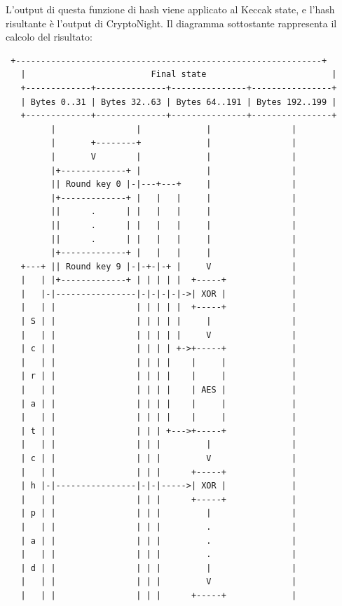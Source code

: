 L'output di questa funzione di hash viene applicato al Keccak state, e
l'hash risultante è l'output di CryptoNight. Il diagramma sottostante
rappresenta il calcolo del risultato:
\begin{verbatim}
 +-------------------------------------------------------------+
   |                         Final state                         |
   +-------------+--------------+---------------+----------------+
   | Bytes 0..31 | Bytes 32..63 | Bytes 64..191 | Bytes 192..199 |
   +-------------+--------------+---------------+----------------+
         |                |             |                |
         |       +--------+             |                |
         |       V        |             |                |
         |+-------------+ |             |                |
         || Round key 0 |-|---+---+     |                |
         |+-------------+ |   |   |     |                |
         ||      .      | |   |   |     |                |
         ||      .      | |   |   |     |                |
         ||      .      | |   |   |     |                |
         |+-------------+ |   |   |     |                |
   +---+ || Round key 9 |-|-+-|-+ |     V                |
   |   | |+-------------+ | | | | |  +-----+             |
   |   |-|----------------|-|-|-|-|->| XOR |             |
   |   | |                | | | | |  +-----+             |
   | S | |                | | | | |     |                |
   |   | |                | | | | |     V                |
   | c | |                | | | | +->+-----+             |
   |   | |                | | | |    |     |             |
   | r | |                | | | |    |     |             |
   |   | |                | | | |    | AES |             |
   | a | |                | | | |    |     |             |
   |   | |                | | | |    |     |             |
   | t | |                | | | +--->+-----+             |
   |   | |                | | |         |                |
   | c | |                | | |         V                |
   |   | |                | | |      +-----+             |
   | h |-|----------------|-|-|----->| XOR |             |
   |   | |                | | |      +-----+             |
   | p | |                | | |         |                |
   |   | |                | | |         .                |
   | a | |                | | |         .                |
   |   | |                | | |         .                |
   | d | |                | | |         |                |
   |   | |                | | |         V                |
   |   | |                | | |      +-----+             |

\end{verbatim}

